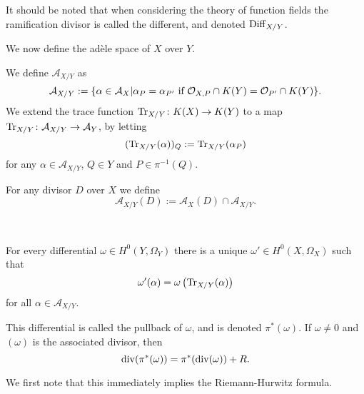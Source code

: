 \begin{rem}
It should be noted that when considering the theory of function fields the ramification divisor is called the different, and denoted ${\rm Diff}_{X/Y}$.
\end{rem}

We now define the ad\`ele space of $X$ over $Y$.

\begin{defn}
 We define $\mathcal {A}_{X/Y}$ as
 \[
  \mathcal{A}_{X/Y} := \{\alpha \in \mathcal{A}_X | \alpha_P =\alpha_{P'}\ \text{if}\ {\cal O}_{X,P}\cap K(Y) = {\cal O}_{P'}\cap K(Y)\}.
 \]
We extend the trace function $\operatorname{Tr}_{X/Y}\colon K(X)\rightarrow K(Y)$ to a map $\operatorname{Tr}_{X/Y}\colon \mathcal{A}_{X/Y} \rightarrow \mathcal{A}_Y$,  by letting
\[
 (\operatorname{Tr}_{X/Y}(\alpha))_Q := \operatorname{Tr}_{X/Y}(\alpha_P)
\]
for any $\alpha \in \mathcal{A}_{X/Y}$, $Q\in Y$ and $P\in \pi^{-1}(Q)$.

For any divisor $D$ over $X$ we define
\[
 \mathcal{A}_{X/Y}(D) := \mathcal{A}_X(D) \cap \mathcal{A}_{X/Y}.
\]

\end{defn}

~

\begin{defnthm}\label{detailedhurwitz}
 For every differential $\omega\in H^0(Y,\Omega_Y)$ there is a unique $\omega'\in H^0(X,\Omega_X)$ such that
 \[
  \omega'(\alpha) = \omega\left(\operatorname{Tr}_{X/Y}(\alpha)\right)
 \]
for all $\alpha \in {\mathcal A}_{X/Y}$.

This differential is called the {\rm pullback} of $\omega$, and is denoted $\pi^*(\omega)$. 
If $\omega\neq 0$ and $(\omega)$ is the associated divisor, then 
\[
 \operatorname{div} ( \pi^*(\omega)) = \pi^*(\operatorname{div}(\omega)) + R.
\]
\end{defnthm}
\begin{comment}
\begin{rem}
 In the language of algebraic geometry, where we would write differentials as $dx$ for some $x\in K(X)$, then this would be phrased differently.
 When we use the result in later sections, it will be written as
 \[
  \di (\pi^* (dx)) = \pi^*(\di (dx)) + R
 \]
for some holomorphic differential $dx$.

Also, it should be noted that in theory of function fields, what we have denoted by $\pi^*(\omega)$ is called the cotrace of $\omega$, and denoted ${\rm Cotr}_{X/Y}(\omega)$.
\end{rem}
\end{comment}
We first note that this immediately implies the Riemann-Hurwitz formula.




